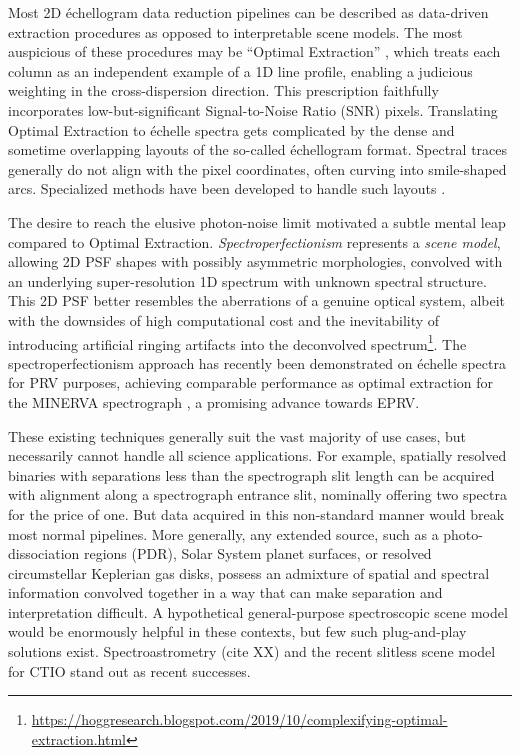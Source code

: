 \documentclass[twocolumn]{aastex63}
\begin{document}
Most 2D \'echellogram data reduction pipelines can be described as data-driven extraction procedures as opposed to interpretable scene models. The most auspicious of these procedures may be ``Optimal Extraction'' \citep{1986PASP...98..609H}, which treats each column as an independent example of a 1D line profile, enabling a judicious weighting in the cross-dispersion direction.  This prescription faithfully incorporates low-but-significant Signal-to-Noise Ratio (SNR) pixels.  Translating Optimal Extraction to \'echelle spectra gets complicated by the dense and sometime overlapping layouts of the so-called \'echellogram format.  Spectral traces generally do not align with the pixel coordinates, often curving into smile-shaped arcs.  Specialized methods have been developed to handle such layouts \citep{2002A&A...385.1095P,2014A&A...561A..59Z,2020arXiv200805827P}.

The desire to reach the elusive photon-noise limit motivated a subtle mental leap compared to Optimal Extraction.  \emph{Spectroperfectionism} \citep{2010PASP..122..248B} represents a \emph{scene model}, allowing 2D PSF shapes with possibly asymmetric morphologies, convolved with an underlying super-resolution 1D spectrum with unknown spectral structure.  This 2D PSF better resembles the aberrations of a genuine optical system, albeit with the downsides of high computational cost and the inevitability of introducing artificial ringing artifacts into the deconvolved spectrum\footnote{\url{https://hoggresearch.blogspot.com/2019/10/complexifying-optimal-extraction.html}}.  The spectroperfectionism approach has recently been demonstrated on \'echelle spectra for PRV purposes, achieving comparable performance as optimal extraction for the MINERVA spectrograph \citep{2019PASP..131l4503C}, a promising advance towards EPRV.

These existing techniques generally suit the vast majority of use cases, but necessarily cannot handle all science applications.  For example, spatially resolved binaries with separations less than the spectrograph slit length can be acquired with alignment along a spectrograph entrance slit, nominally offering two spectra for the price of one.  But data acquired in this non-standard manner would break most normal pipelines.  More generally, any extended source, such as a photo-dissociation regions (PDR), Solar System planet surfaces, or resolved circumstellar Keplerian gas disks, possess an admixture of spatial and spectral information convolved together in a way that can make separation and interpretation difficult.  A hypothetical general-purpose spectroscopic scene model would be enormously helpful in these contexts, but few such plug-and-play solutions exist.  Spectroastrometry (cite XX) and the recent slitless scene model for CTIO \citep{2023arXiv230704898N} stand out as recent successes.
\end{document}
